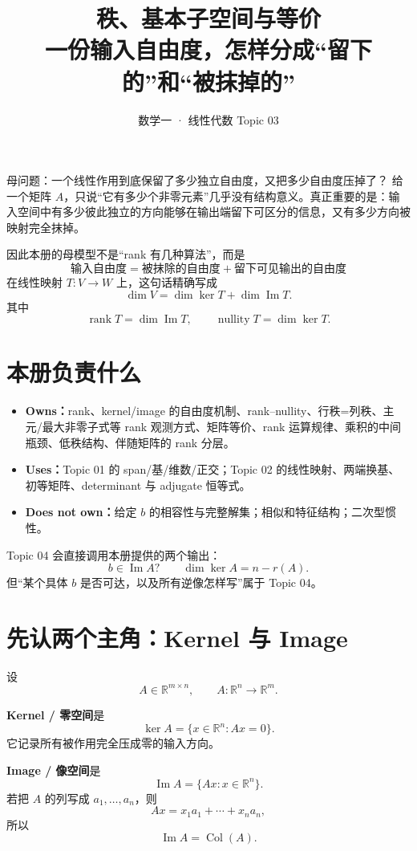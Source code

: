 \documentclass[11pt,a4paper]{ctexart}
\title{\vspace{-1.1cm}\textbf{秩、基本子空间与等价}\\[0.4em]
\large 一份输入自由度，怎样分成“留下的”和“被抹掉的”}
\author{数学一 · 线性代数 Topic 03}
\date{}
\newcommand{\kw}[1]{\textbf{\color{deep}#1}}
\begin{document}
\maketitle

\begin{corebox}{母问题：一个线性作用到底保留了多少独立自由度，又把多少自由度压掉了？}
给一个矩阵 $A$，只说“它有多少个非零元素”几乎没有结构意义。真正重要的是：输入空间中有多少彼此独立的方向能够在输出端留下可区分的信息，又有多少方向被映射完全抹掉。

因此本册的母模型不是“rank 有几种算法”，而是
\[
\boxed{
\text{输入自由度}
=\text{被抹除的自由度}
+\text{留下可见输出的自由度}
}
\]
在线性映射 $T:V\to W$ 上，这句话精确写成
\[
\boxed{
\dim V=\dim\ker T+\dim\operatorname{Im}T.
}
\]
其中
\[
\operatorname{rank}T=\dim\operatorname{Im}T,
\qquad
\operatorname{nullity}T=\dim\ker T.
\]
\end{corebox}

\section{本册负责什么}

\begin{itemize}
  \item \kw{Owns：}rank、kernel/image 的自由度机制、rank--nullity、行秩=列秩、主元/最大非零子式等 rank 观测方式、矩阵等价、rank 运算规律、乘积的中间瓶颈、低秩结构、伴随矩阵的 rank 分层。
  \item \kw{Uses：}Topic 01 的 span/基/维数/正交；Topic 02 的线性映射、两端换基、初等矩阵、determinant 与 adjugate 恒等式。
  \item \kw{Does not own：}给定 $b$ 的相容性与完整解集；相似和特征结构；二次型惯性。
\end{itemize}

Topic 04 会直接调用本册提供的两个输出：
\[
\boxed{b\in\operatorname{Im}A?}
\qquad
\boxed{\dim\ker A=n-r(A).}
\]
但“某个具体 $b$ 是否可达，以及所有逆像怎样写”属于 Topic 04。

\section{先认两个主角：Kernel 与 Image}

设
\[
A\in\mathbb R^{m\times n},
\qquad
A:\mathbb R^n\to\mathbb R^m.
\]

\kw{Kernel / 零空间}是
\[
\ker A=\{x\in\mathbb R^n:Ax=0\}.
\]
它记录所有被作用完全压成零的输入方向。

\kw{Image / 像空间}是
\[
\operatorname{Im}A=\{Ax:x\in\mathbb R^n\}.
\]
若把 $A$ 的列写成 $a_1,\dots,a_n$，则
\[
Ax=x_1a_1+\cdots+x_na_n,
\]
所以
\[
\boxed{\operatorname{Im}A=\operatorname{Col}(A).}
\]
\end{document}
